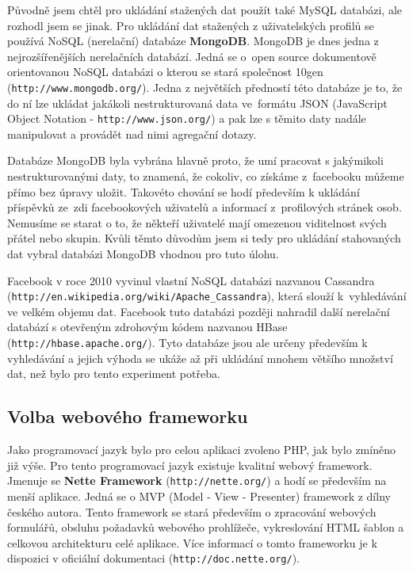 \documentclass[thesis=M,czech]{FITthesis}[2013/05/10]
\begin{document}
Původně jsem chtěl pro ukládání stažených dat použít také MySQL databázi, ale rozhodl jsem se jinak. Pro ukládání dat stažených z uživatelských profilů se používá NoSQL (nerelační) databáze \textbf{MongoDB}. MongoDB je dnes jedna z nejrozšířenějších nerelačních databází. Jedná se o~open source dokumentově orientovanou NoSQL databázi o kterou se stará společnost 10gen (\verb|http://www.mongodb.org/|). Jedna z největších předností této databáze je to, že do ní lze ukládat jakákoli nestrukturovaná data ve~formátu JSON (JavaScript Object Notation - \verb|http://www.json.org/|) a pak lze s těmito daty nadále manipulovat a provádět nad nimi agregační dotazy. 

Databáze MongoDB byla vybrána hlavně proto, že umí pracovat s jakýmikoli nestrukturovanými daty, to znamená, že cokoliv, co získáme z~facebooku můžeme přímo bez úpravy uložit. Takovéto chování se hodí především k ukládání příspěvků ze~zdi facebookových uživatelů a informací z~profilových stránek osob. Nemusíme se starat o to, že někteří uživatelé mají omezenou viditelnost svých přátel nebo skupin. Kvůli těmto důvodům jsem si tedy pro ukládání stahovaných dat vybral databázi MongoDB vhodnou pro tuto úlohu.

Facebook v roce 2010 vyvinul vlastní NoSQL databázi nazvanou Cassandra (\verb|http://en.wikipedia.org/wiki/Apache_Cassandra|), která slouží k~vyhledávání ve velkém objemu dat. Facebook tuto databázi později nahradil další nerelační databází  s otevřeným zdrohovým kódem nazvanou HBase (\verb|http://hbase.apache.org/|). Tyto databáze jsou ale určeny především k vyhledávání a jejich výhoda se ukáže až při ukládání mnohem většího množství dat, než bylo pro tento experiment potřeba.

\subsection{Volba webového frameworku}

Jako programovací jazyk bylo pro celou aplikaci zvoleno PHP, jak bylo zmíněno již výše. Pro tento programovací jazyk existuje kvalitní webový framework. Jmenuje se \textbf{Nette Framework} (\verb|http://nette.org/|) a hodí se především na menší aplikace. Jedná se o MVP (Model - View - Presenter) framework z dílny českého autora. Tento framework se stará především o zpracování webových formulářů, obsluhu požadavků webového prohlížeče, vykreslování HTML šablon a celkovou architekturu celé aplikace. Více informací o tomto frameworku je k dispozici v oficiální dokumentaci (\verb|http://doc.nette.org/|). 
\end{document}
